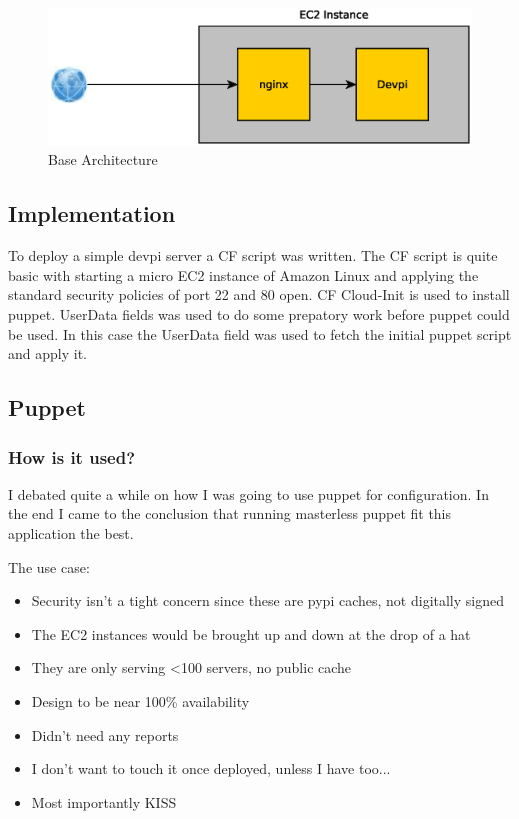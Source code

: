 \documentclass[12pt, letterpaper]{article}
\begin{document}
\begin{figure}[H]
    \caption{Base Architecture}
    \centering
    \includegraphics[width=\textwidth]{figures/base_arch.eps}
\end{figure}


\subsection{Implementation}
To deploy a simple devpi server a CF script was written. The CF script
is quite basic with starting a micro EC2 instance of Amazon Linux and applying the standard security policies of
port 22 and 80 open. CF Cloud-Init is used to install puppet. UserData fields was used to do some prepatory work before
puppet could be used. In this case the UserData field was used to fetch the initial puppet script and apply it.

\subsection{Puppet}
\subsubsection{How is it used?}
I debated quite a while on how I was going to use puppet for configuration. In the end I came to the conclusion that
running masterless puppet fit this application the best.  

The use case:
\begin{itemize}
    \item Security isn't a tight concern since these are pypi caches, not digitally signed
    \item The EC2 instances would be brought up and down at the drop of a hat
    \item They are only serving \textless 100 servers, no public cache
    \item Design to be near 100\% availability 
    \item Didn't need any reports
    \item I don't want to touch it once deployed, unless I have too... 
    \item Most importantly KISS
\end{itemize}
\end{document}
